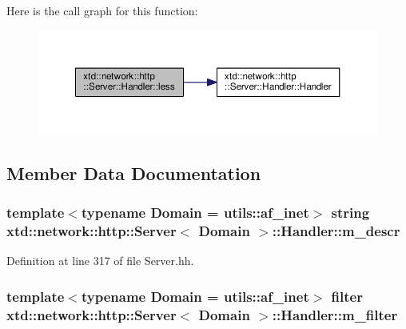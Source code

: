 Here is the call graph for this function\+:
\nopagebreak
\begin{figure}[H]
\begin{center}
\leavevmode
\includegraphics[width=350pt]{classxtd_1_1network_1_1http_1_1Server_1_1Handler_a91c38afd6870731fe9f1b79d2cfda19f_cgraph}
\end{center}
\end{figure}




\subsection{Member Data Documentation}
\subsubsection[{\texorpdfstring{m\+\_\+descr}{m_descr}}]{\setlength{\rightskip}{0pt plus 5cm}template$<$typename Domain  = utils\+::af\+\_\+inet$>$ string {\bf xtd\+::network\+::http\+::\+Server}$<$ Domain $>$\+::Handler\+::m\+\_\+descr}\hypertarget{classxtd_1_1network_1_1http_1_1Server_1_1Handler_aae46aaaf81c803b4ac6dd1a5b60feb36}{}\label{classxtd_1_1network_1_1http_1_1Server_1_1Handler_aae46aaaf81c803b4ac6dd1a5b60feb36}


Definition at line 317 of file Server.\+hh.

\subsubsection[{\texorpdfstring{m\+\_\+filter}{m_filter}}]{\setlength{\rightskip}{0pt plus 5cm}template$<$typename Domain  = utils\+::af\+\_\+inet$>$ {\bf filter} {\bf xtd\+::network\+::http\+::\+Server}$<$ Domain $>$\+::Handler\+::m\+\_\+filter}\hypertarget{classxtd_1_1network_1_1http_1_1Server_1_1Handler_a95854563aaa6e9c7fcced63d351e47a3}{}\label{classxtd_1_1network_1_1http_1_1Server_1_1Handler_a95854563aaa6e9c7fcced63d351e47a3}


